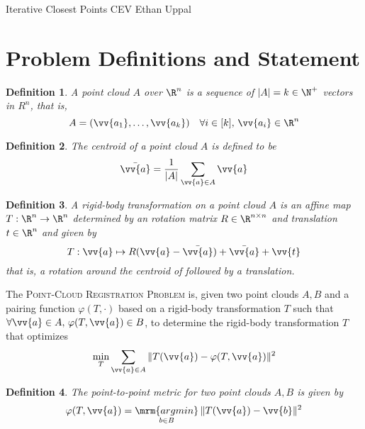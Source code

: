 \documentclass[12pt]{article}
\theoremstyle{defstyle}
\newtheorem{defn}{Definition}
\begin{document}
\begin{generic}
    Iterative Closest Points \hfill CEV \vbar Ethan Uppal
\end{generic}

\section{Problem Definitions and Statement}

\begin{defn}
    A \emph{point cloud} $A$ over $\R^n$ is a sequence of $|A| = k \in \N^+$ vectors in $R^n$, that is,
    \[
        A = (\vv{a_1}, \dots, \vv{a_k}) \quad \forall i \in [k],\, \vv{a_i} \in \R^n
    \]
\end{defn}

\begin{defn}
    The \emph{centroid} of a point cloud $A$ is defined to be
    \[
        \bar{\vv{a}} = \frac{1}{|A|} \sum_{\vv{a} \in A} \vv{a}
    \]
\end{defn}

\begin{defn}
    A \emph{rigid-body transformation} on a point cloud $A$ is an affine map $T : \R^n \to \R^n$ determined by an rotation matrix $R \in \R^{n \times n}$ and translation $t \in \R^n$ and given by
    \[
        T : \vv{a} \mapsto R(\vv{a} - \bar{\vv{a}}) + \bar{\vv{a}} + \vv{t}
    \]
    that is, a rotation around the centroid of followed by a translation.
\end{defn}

\begin{outline}
    The \textsc{Point-Cloud Registration Problem} is, given two point clouds $A, B$ and a pairing function $\varphi(T, \cdot)$ based on a rigid-body transformation $T$ such that $\forall \vv{a} \in A,\, \varphi(T, \vv{a}) \in B$, to determine the rigid-body transformation $T$ that optimizes
    \begin{equation}\label{icp}
        \min\limits_{\substack{T}} \sum_{\vv{a} \in A} \| T(\vv{a}) - \varphi(T, \vv{a}) \|^2
    \end{equation}
\end{outline}

\begin{defn}
    The \emph{point-to-point metric} for two point clouds $A, B$ is given by
    \begin{equation}
        \varphi(T, \vv{a}) = \mathop{\mrm{argmin}}\limits_{\substack{b \in B}} \| T(\vv{a}) - \vv{b} \|^2
    \end{equation}
\end{defn}
\end{document}
